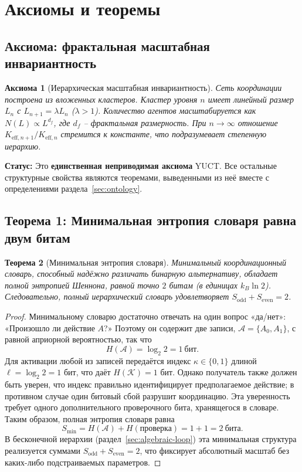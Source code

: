 \documentclass[12pt,a4paper]{article}
\newtheorem{theorem}{Теорема}[section]
\newtheorem{axiom}[theorem]{Аксиома}
\begin{document}
	\section{Аксиомы и теоремы}
	\label{sec:axioms}
	
	\subsection{Аксиома: фрактальная масштабная инвариантность}
	
	\begin{axiom}[Иерархическая масштабная инвариантность] \label{ax:A1}
		Сеть координации построена из вложенных кластеров. Кластер уровня \(n\) имеет линейный размер \(L_n\) с \(L_{n+1} = \lambda L_n\) (\(\lambda > 1\)). Количество агентов масштабируется как \(N(L) \propto L^{d_f}\), где \(d_f\) – фрактальная размерность. При \(n \to \infty\) отношение \(K_{\mathrm{eff},n+1}/K_{\mathrm{eff},n}\) стремится к константе, что подразумевает степенную иерархию.
	\end{axiom}
	
	\textbf{Статус:} Это \textbf{единственная неприводимая аксиома} YUCT. Все остальные структурные свойства являются теоремами, выведенными из неё вместе с определениями раздела~\ref{sec:ontology}.
	
	\subsection{Теорема 1: Минимальная энтропия словаря равна двум битам}
	
	\begin{theorem}[Минимальная энтропия словаря]
		\label{thm:minimal-dict}
		Минимальный координационный словарь, способный надёжно различать бинарную альтернативу, обладает полной энтропией Шеннона, равной точно \(2\) битам (в единицах \(k_B\ln 2\)). Следовательно, полный иерархический словарь удовлетворяет \(S_{\mathrm{odd}} + S_{\mathrm{even}} = 2\).
	\end{theorem}
	
	\begin{proof}
		Минимальному словарю достаточно отвечать на один вопрос «да/нет»: «Произошло ли действие \(A\)?» Поэтому он содержит две записи, \(\mathcal{A} = \{A_0, A_1\}\), с равной априорной вероятностью, так что
		\[
		H(\mathcal{A}) = \log_2 2 = 1\ \text{бит}.
		\]
		Для активации любой из записей передаётся индекс \(\kappa \in \{0,1\}\) длиной \(\ell = \log_2 2 = 1\) бит, что даёт \(H(\mathcal{K}) = 1\) бит. Однако получатель также должен быть уверен, что индекс правильно идентифицирует предполагаемое действие; в противном случае один битовый сбой разрушит координацию. Эта уверенность требует одного дополнительного проверочного бита, хранящегося в словаре. Таким образом, полная энтропия словаря равна
		\[
		S_{\min} = H(\mathcal{A}) + H(\text{проверка}) = 1 + 1 = 2\ \text{бита}.
		\]
		В бесконечной иерархии (раздел~\ref{sec:algebraic-loop}) эта минимальная структура реализуется суммами \(S_{\mathrm{odd}} + S_{\mathrm{even}} = 2\), что фиксирует абсолютный масштаб без каких-либо подстраиваемых параметров.
	\end{proof}
	
\end{document}
